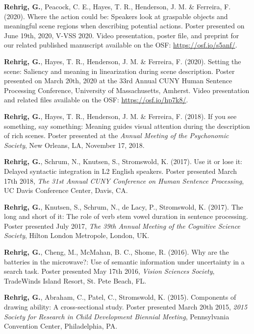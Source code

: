 \textbf{Rehrig, G.}, Peacock, C. E., Hayes, T. R., Henderson, J. M. \& Ferreira, F. (2020). Where the action could be: Speakers look at graspable objects and meaningful scene regions when describing potential actions. Poster presented on June 19th, 2020, V-VSS 2020. Video presentation, poster file, and preprint for our related published manuscript available on the OSF: \url{https://osf.io/s5anf/}.

\textbf{Rehrig, G.}, Hayes, T. R., Henderson, J. M. \& Ferreira, F. (2020). Setting the scene: Saliency and meaning in linearization during scene description. Poster presented on March 20th, 2020 at the 33rd Annual CUNY Human Sentence Processing Conference, University of Massachusetts, Amherst. Video presentation and related files available on the OSF: \url{https://osf.io/hp7k8/}.

\textbf{Rehrig, G.}, Hayes, T. R., Henderson, J. M. \& Ferreira, F. (2018). If you see something, say something: Meaning guides visual attention during the description of rich scenes. Poster presented at the \textit{Annual Meeting of the Psychonomic Society}, New Orleans, LA, November 17, 2018.


\textbf{Rehrig, G.}, Schrum, N., Knutsen, S., Stromswold, K. (2017). Use it or lose it: Delayed syntactic integration in L2 English speakers. Poster presented March 17th 2018, \textit{The 31st Annual CUNY Conference on Human Sentence Processing}, UC Davis Conference Center, Davis, CA.



\textbf{Rehrig, G.}, Knutsen, S., Schrum, N., de Lacy, P., Stromswold, K. (2017). The long and short of it: The role of verb stem vowel duration in sentence processing. Poster presented July  2017, \textit{The 39th Annual Meeting of the Cognitive Science Society}, Hilton London Metropole, London, UK.



\textbf{Rehrig, G.}, Cheng, M., McMahan, B. C., Shome, R. (2016). Why are the batteries in the microwave?: Use of semantic information under uncertainty in a search task. Poster presented May 17th 2016, \textit{Vision Sciences Society}, TradeWinds Island Resort, St. Pete Beach, FL.



\textbf{Rehrig, G.}, Abraham, C., Patel, C., Stromswold, K. (2015). Components of drawing ability: A cross-sectional study. Poster presented March 20th 2015, \textit{2015 Society for Research in Child Development Biennial Meeting}, Pennsylvania Convention Center, Philadelphia, PA.



